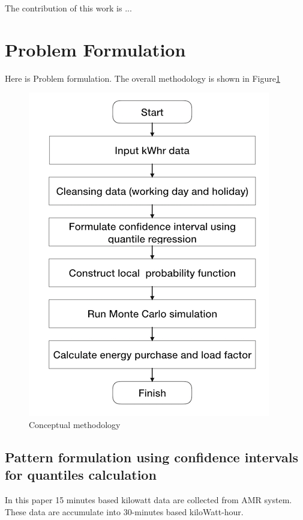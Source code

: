 \documentclass[conference]{IEEEtran}
\begin{document}
The contribution of this work is ...


\section{Problem Formulation}
Here is Problem formulation.
The overall methodology is shown in Figure\ref{fig.overall_methodology}

\begin{figure}[htbp]
  \centerline{\includegraphics{images/overall_methodology.png}}
  \caption{Conceptual methodology}
  \label{fig.overall_methodology}
\end{figure}



\subsection{Pattern formulation using confidence intervals for quantiles calculation}
In this paper 15 minutes based kilowatt data are collected from AMR system. These data are accumulate into 30-minutes based kiloWatt-hour.
\end{document}
